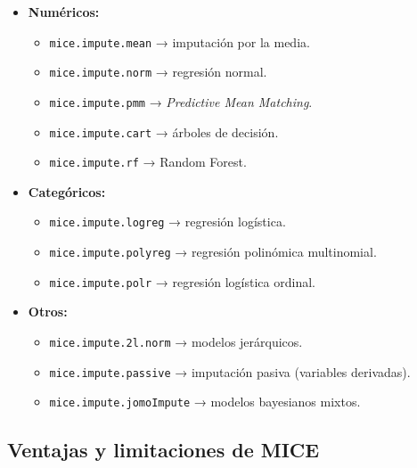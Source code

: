 \documentclass[
]{book}
\providecommand{\tightlist}{%
  \setlength{\itemsep}{0pt}\setlength{\parskip}{0pt}}
\begin{document}
\begin{itemize}
\tightlist
\item
  \textbf{Numéricos:}

  \begin{itemize}
  \tightlist
  \item
    \texttt{mice.impute.mean} → imputación por la media.\\
  \item
    \texttt{mice.impute.norm} → regresión normal.\\
  \item
    \texttt{mice.impute.pmm} → \emph{Predictive Mean Matching}.\\
  \item
    \texttt{mice.impute.cart} → árboles de decisión.\\
  \item
    \texttt{mice.impute.rf} → Random Forest.
  \end{itemize}
\item
  \textbf{Categóricos:}

  \begin{itemize}
  \tightlist
  \item
    \texttt{mice.impute.logreg} → regresión logística.\\
  \item
    \texttt{mice.impute.polyreg} → regresión polinómica multinomial.\\
  \item
    \texttt{mice.impute.polr} → regresión logística ordinal.
  \end{itemize}
\item
  \textbf{Otros:}

  \begin{itemize}
  \tightlist
  \item
    \texttt{mice.impute.2l.norm} → modelos jerárquicos.\\
  \item
    \texttt{mice.impute.passive} → imputación pasiva (variables derivadas).\\
  \item
    \texttt{mice.impute.jomoImpute} → modelos bayesianos mixtos.
  \end{itemize}
\end{itemize}

\subsection{Ventajas y limitaciones de MICE}\label{ventajas-y-limitaciones-de-mice}
\end{document}
